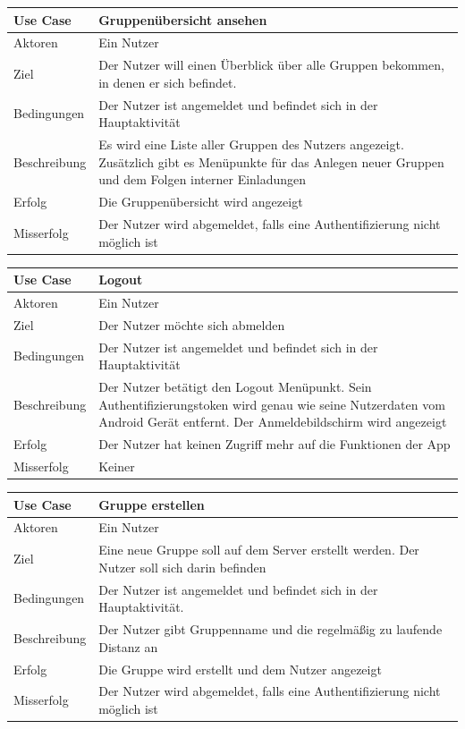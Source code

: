 \begin{tabular}{|p{}|p{}|}
\hline
\textbf{Use Case} & \textbf{Gruppenübersicht ansehen} \\ \hline \hline
Aktoren &  Ein Nutzer \\ \hline
Ziel &  Der Nutzer will einen Überblick über alle Gruppen bekommen, in denen er sich befindet. \\ \hline
Bedingungen &  Der Nutzer ist angemeldet und befindet sich in der Hauptaktivität\\ \hline
Beschreibung &  Es wird eine Liste aller Gruppen des Nutzers angezeigt. Zusätzlich gibt es Menüpunkte für das Anlegen neuer Gruppen und dem Folgen interner Einladungen \\ \hline
Erfolg & Die Gruppenübersicht wird angezeigt \\ \hline
Misserfolg & Der Nutzer wird abgemeldet, falls eine Authentifizierung nicht möglich ist \\ \hline
\hline \end{tabular}
\begin{tabular}{|p{}|p{}|}
\hline
\textbf{Use Case} & \textbf{Logout} \\ \hline \hline
Aktoren &  Ein Nutzer \\ \hline
Ziel &  Der Nutzer möchte sich abmelden \\ \hline
Bedingungen &  Der Nutzer ist angemeldet und befindet sich in der Hauptaktivität \\ \hline
Beschreibung & Der Nutzer betätigt den Logout Menüpunkt. Sein Authentifizierungstoken wird genau wie seine Nutzerdaten vom Android Gerät entfernt. Der Anmeldebildschirm wird angezeigt \\ \hline
Erfolg & Der Nutzer hat keinen Zugriff mehr auf die Funktionen der App\\ \hline
Misserfolg & Keiner \\ \hline
\hline \end{tabular}
\begin{tabular}{|p{}|p{}|}
\hline
\textbf{Use Case} & \textbf{Gruppe erstellen} \\ \hline \hline
Aktoren &  Ein Nutzer \\ \hline
Ziel &  Eine neue Gruppe soll auf dem Server erstellt werden. Der Nutzer soll sich darin befinden \\ \hline
Bedingungen &  Der Nutzer ist angemeldet und befindet sich in der Hauptaktivität. \\ \hline
Beschreibung &  Der Nutzer gibt Gruppenname und die regelmäßig zu laufende Distanz an \\ \hline
Erfolg & Die Gruppe wird erstellt und dem Nutzer angezeigt \\ \hline
Misserfolg & Der Nutzer wird abgemeldet, falls eine Authentifizierung nicht möglich ist \\ \hline
\hline \end{tabular}
